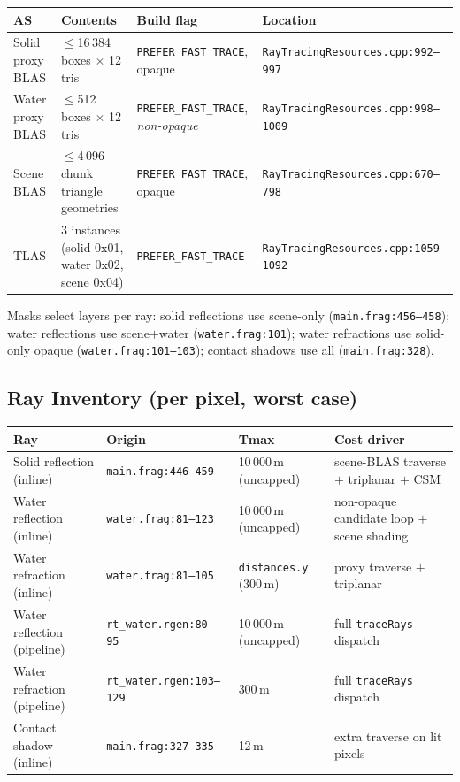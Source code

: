 \documentclass[11pt,a4paper]{article}
\begin{document}
\begin{longtable}{@{}llll@{}}
\toprule
\textbf{AS} & \textbf{Contents} & \textbf{Build flag} & \textbf{Location} \\
\midrule
Solid proxy BLAS & $\leq$16\,384 boxes $\times$ 12 tris & \texttt{PREFER\_FAST\_TRACE}, opaque & \texttt{RayTracingResources.cpp:992--997} \\
Water proxy BLAS & $\leq$512 boxes $\times$ 12 tris & \texttt{PREFER\_FAST\_TRACE}, \textit{non-opaque} & \texttt{RayTracingResources.cpp:998--1009} \\
Scene BLAS & $\leq$4\,096 chunk triangle geometries & \texttt{PREFER\_FAST\_TRACE}, opaque & \texttt{RayTracingResources.cpp:670--798} \\
TLAS & 3 instances (solid 0x01, water 0x02, scene 0x04) & \texttt{PREFER\_FAST\_TRACE} & \texttt{RayTracingResources.cpp:1059--1092} \\
\bottomrule
\end{longtable}

Masks select layers per ray: solid reflections use scene-only (\texttt{main.frag:456--458}); water reflections use scene$+$water (\texttt{water.frag:101}); water refractions use solid-only opaque (\texttt{water.frag:101--103}); contact shadows use all (\texttt{main.frag:328}).

\subsection{Ray Inventory (per pixel, worst case)}

\begin{longtable}{@{}llll@{}}
\toprule
\textbf{Ray} & \textbf{Origin} & \textbf{Tmax} & \textbf{Cost driver} \\
\midrule
Solid reflection (inline) & \texttt{main.frag:446--459} & 10\,000\,m (uncapped) & scene-BLAS traverse $+$ triplanar $+$ CSM \\
Water reflection (inline) & \texttt{water.frag:81--123} & 10\,000\,m (uncapped) & non-opaque candidate loop $+$ scene shading \\
Water refraction (inline) & \texttt{water.frag:81--105} & \texttt{distances.y} (300\,m) & proxy traverse $+$ triplanar \\
Water reflection (pipeline) & \texttt{rt\_water.rgen:80--95} & 10\,000\,m (uncapped) & full \texttt{traceRays} dispatch \\
Water refraction (pipeline) & \texttt{rt\_water.rgen:103--129} & 300\,m & full \texttt{traceRays} dispatch \\
Contact shadow (inline) & \texttt{main.frag:327--335} & 12\,m & extra traverse on lit pixels \\
\bottomrule
\end{longtable}
\end{document}
